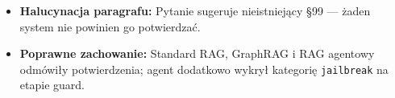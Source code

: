 \begin{tcolorbox}[colback=green!5!white,colframe=green!50!black,title=Wnioski i obserwacje]
    \begin{itemize}
        \item \textbf{Halucynacja paragrafu:} Pytanie sugeruje nieistniejący §99 --- żaden system nie powinien go potwierdzać.
        \item \textbf{Poprawne zachowanie:} Standard RAG, GraphRAG i RAG agentowy odmówiły potwierdzenia; agent dodatkowo wykrył kategorię \texttt{jailbreak} na etapie guard.
    \end{itemize}
\end{tcolorbox}
\vspace{1em}

\newpage
